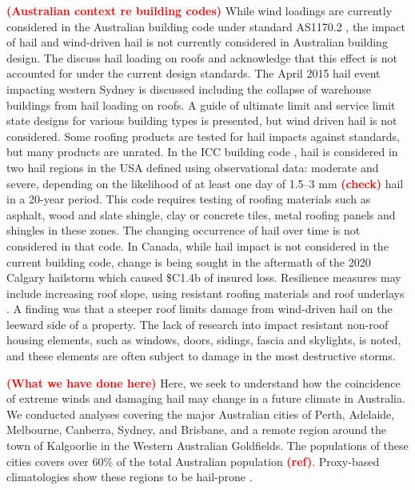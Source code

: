 \documentclass[]{agujournal2019}\usepackage[]{graphicx}\usepackage[]{xcolor}
\newcommand*{\todo}[1]{\textbf{\textcolor{red}{(#1)}}}
\newcommand*{\mref}{\todo{ref}}
\begin{document}
\todo{Australian context re building codes} While wind loadings are currently
considered in the Australian building code \cite{ABCB_2024} under standard
AS1170.2 \cite{Standards_2021}, the impact of hail and wind-driven hail is not
currently considered in Australian building design. The 
discuss hail loading on roofs and acknowledge that this effect is not accounted
for under the current design standards. The April 2015 hail event impacting
western Sydney is discussed including the collapse of warehouse buildings from
hail loading on roofs. A guide of ultimate limit and service limit state designs
for various building types is presented, but wind driven hail is not considered.
Some roofing products are tested for hail impacts against standards, but many
products are unrated. In the ICC building code \cite{ICC_2008}, hail is
considered in two hail regions in the USA defined using observational data:
moderate and severe, depending on the likelihood of at least one day of 1.5--3
mm \todo{check} hail in a 20-year period. This code requires testing of roofing
materials such as asphalt, wood and slate shingle, clay or concrete tiles, metal
roofing panels and shingles in these zones. The changing occurrence of hail over
time is not considered in that code. In Canada, while hail impact is not
considered in the current building code,  change is being sought in the
aftermath of the 2020 Calgary hailstorm which caused \$C1.4b of insured loss.
Resilience measures may include increasing roof slope, using resistant roofing
materials and roof underlays \cite{ICLR_2018}. A finding was that a steeper roof
limits damage from wind-driven hail on the leeward side of a property. The lack
of research into impact resistant non-roof housing elements, such as windows,
doors, sidings, fascia and skylights, is noted, and these elements are often
subject to damage in the most destructive storms.

\todo{What we have done here} Here, we seek to understand how the coincidence of
extreme winds and damaging hail may change in a future climate in Australia. We
conducted analyses covering the major Australian cities of Perth, Adelaide,
Melbourne, Canberra, Sydney, and Brisbane, and a remote region around the town
of Kalgoorlie in the Western Australian Goldfields. The populations of these
cities covers over 60\% of the total Australian population \mref{}. Proxy-based
climatologies show these regions to be hail-prone \cite{Raupach_npjCAS_2023}.
\end{document}
